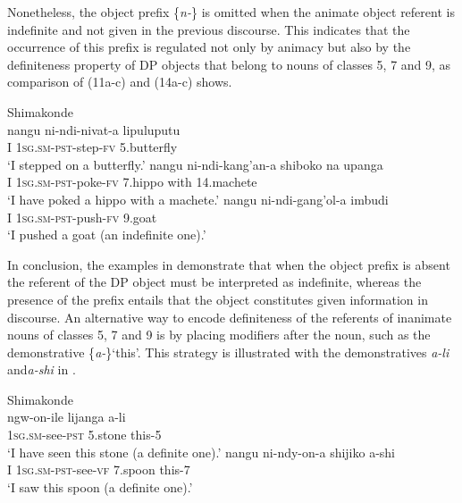 \documentclass[output=paper]{langsci/langscibook}
\begin{document}
Nonetheless, the object prefix \{{\textit{n-}}\} is omitted when the animate object referent is indefinite and not given in the previous discourse. This indicates that the occurrence of this prefix is regulated not only by animacy but also by the definiteness property of DP objects that belong to nouns of classes 5, 7 and 9, as comparison of (11a-c) and (14a-c) shows.


\ea\label{ex:nguna:14}
\ea
{Shimakonde}\\
\gll nangu        ni-ndi-nivat-a                 lipuluputu\\
     I                \textsc{1sg.sm-pst}-step-\textsc{fv}        5.butterfly\\
\glt ‘I stepped on a butterfly.’
\ex\label{ex:nguna:14b}
\gll nangu        ni-ndi-kang'an-a             shiboko           na       upanga\\
     I                \textsc{1sg.sm-pst}-poke-\textsc{fv}       7.hippo            with   14.machete\\
\glt ‘I have poked a hippo with a machete.’
\ex\label{ex:nguna:14c}
\gll nangu        ni-ndi-gang'ol-a             imbudi\\
     I                \textsc{1sg.sm-pst}-push-\textsc{fv}       9.goat\\
\glt ‘I pushed a goat (an indefinite one).’
\z
\z

{In conclusion, the examples in } {demonstrate that when the object prefix is absent the referent of the DP object must be interpreted as indefinite, whereas the presence of the prefix entails that the object constitutes given information in discourse. }{An alternative way to encode definiteness of the referents of inanimate nouns of classes 5, 7 and 9 is by placing modifiers after the noun, such as the demonstrative \{}{\textit{a-}}{\}}{\textit {}}{‘this’. This strategy is illustrated with the demonstratives }{\textit{a-li }}{and}{\textit {a-shi}} {in }.


\ea\label{ex:nguna:15}
\ea
{Shimakonde}\\
\gll ngw-on-ile               lijanga        a-li\\
     \textsc{1sg.sm}-see-\textsc{pst}       5.stone        this-5\\
\glt ‘I have seen this stone (a definite one).’
\ex\label{ex:nguna:15b}
\gll nangu      ni-ndy-on-a                shijiko         a-shi\\
     I              \textsc{1sg.sm-pst}-see-\textsc{vf }     7.spoon       this-7\\
\glt ‘I saw this spoon (a definite one).’
\z
\z
\end{document}
